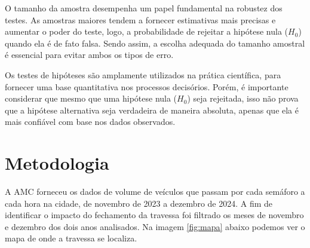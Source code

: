 O tamanho da amostra desempenha um papel fundamental na robustez dos testes. As amostras maiores tendem a fornecer estimativas mais precisas e aumentar o poder do teste, logo, a probabilidade de rejeitar a hipótese nula (\( H_0 \)) quando ela é de fato falsa. Sendo assim, a escolha adequada do tamanho amostral é essencial para evitar ambos os tipos de erro. 

Os testes de hipóteses são amplamente utilizados na prática científica, para fornecer uma base quantitativa nos processos decisórios. Porém, é importante considerar que mesmo que uma hipótese nula (\( H_0 \)) seja rejeitada, isso não prova que a hipótese alternativa seja verdadeira de maneira absoluta, apenas que ela é mais confiável com base nos dados observados. 
\section{Metodologia}
A AMC forneceu os dados de volume de veículos que passam por cada semáforo a cada hora na cidade, de novembro de 2023 a dezembro de 2024. A fim de identificar o impacto do fechamento da travessa foi filtrado os meses de novembro e dezembro dos dois anos analisados. Na imagem \ref{fig:mapa} abaixo podemos ver o mapa de onde a travessa se localiza.  

